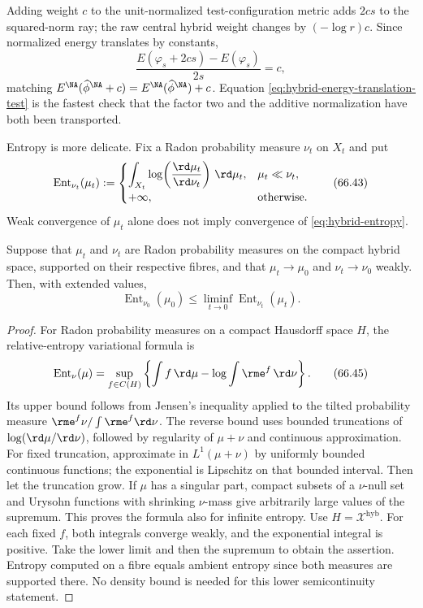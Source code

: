 Adding weight $c$ to the unit-normalized test-configuration metric adds
$2cs$ to the squared-norm ray; the raw central hybrid weight changes by
$(-\log r)c$. Since normalized energy translates by constants,
\[
 \frac{E(\varphi_s+2cs)-E(\varphi_s)}{2s}=c,
\tag{66.42}\label{eq:hybrid-energy-translation-test}
\]
matching $E^{\NA}(\widehat\phi^{\NA}+c)=E^{\NA}(\widehat\phi^{\NA})+c$.
Equation \eqref{eq:hybrid-energy-translation-test} is the fastest check that
the factor two and the additive normalization have both been transported.

Entropy is more delicate. Fix a Radon probability measure
$\nu_t$ on $X_t$ and put
\[
  \operatorname{Ent}_{\nu_t}(\mu_t)
      :=
      \begin{cases}
       \displaystyle\int_{X_t}
          \log\!\left(\frac{\rd\mu_t}{\rd\nu_t}\right)\,\rd\mu_t,
          &\mu_t\ll\nu_t,\\[6pt]
       +\infty,&\text{otherwise}.
      \end{cases}
\tag{66.43}\label{eq:hybrid-entropy}
\]
Weak convergence of $\mu_t$ alone does not imply convergence of
\eqref{eq:hybrid-entropy}.

\begin{proposition}\label{prop:hybrid-entropy-liminf}
Suppose that $\mu_t$ and $\nu_t$ are Radon probability measures on the compact hybrid space, supported on their respective fibres, and that $\mu_t\to\mu_0$ and $\nu_t\to\nu_0$ weakly. Then, with extended values,
\[
 \operatorname{Ent}_{\nu_0}(\mu_0)
       \leq\liminf_{t\to0}\operatorname{Ent}_{\nu_t}(\mu_t).
\tag{66.44}\label{eq:hybrid-entropy-liminf}
\]
\end{proposition}

\begin{proof}
For Radon probability measures on a compact Hausdorff space $H$, the
relative-entropy variational formula is
\[
 \operatorname{Ent}_{\nu}(\mu)
 =\sup_{f\in C(H)}
   \left\{\int f\,\rd\mu-\log\int\rme^f\,\rd\nu\right\}.
\tag{66.45}\label{eq:hybrid-entropy-dual}
\]
Its upper bound follows from Jensen's inequality applied to the tilted
probability measure $\rme^f\nu/\int\rme^f\rd\nu$. The reverse bound uses
bounded truncations of $\log(\rd\mu/\rd\nu)$, followed by regularity of
$\mu+\nu$ and continuous approximation. For fixed truncation, approximate
in $L^1(\mu+\nu)$ by uniformly bounded continuous functions; the exponential
is Lipschitz on that bounded interval. Then let the truncation grow.
If $\mu$ has a singular part, compact subsets of a $\nu$-null set and
Urysohn functions with shrinking $\nu$-mass give arbitrarily large values
of the supremum. This proves the formula also for infinite entropy.
Use $H=\mathcal X^{\mathrm{hyb}}$. For each fixed $f$, both integrals
converge weakly, and the exponential integral is positive. Take the lower
limit and then the supremum to obtain the assertion. Entropy computed on
a fibre equals ambient entropy since both measures are supported there.
No density bound is needed for this lower semicontinuity statement.
\end{proof}

